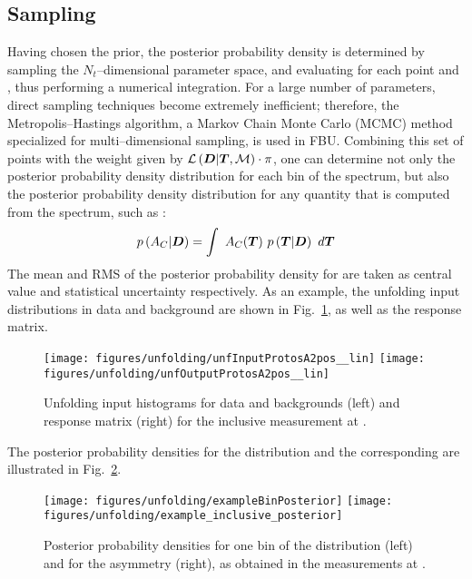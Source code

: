\subsection{Sampling}
\label{sec:sampling}
Having chosen the prior, the posterior probability density
\conditionalProb{\Truth{}}{\Data{}} is determined by sampling the
$N_t$--dimensional parameter space, and evaluating for each point
\conditionalLhood{\Data{}}{\Truth{}} and \prior{}, thus performing a
numerical integration. For a large number of parameters, direct
sampling techniques become extremely inefficient; therefore, the
Metropolis--Hastings algorithm, a Markov
Chain Monte Carlo (MCMC) method specialized for multi--dimensional
sampling, is used in FBU.
Combining this set of points with the weight given by
$\mathcal{L}\left(\boldsymbol{D}{}|\boldsymbol{T}{},\mathcal{M}{}\right)\cdot{}\pi{}$, one
can determine not only the posterior probability density distribution
for each bin of the spectrum, but also the posterior probability
density distribution for any quantity that is computed from the
spectrum, such as \ac{}:
\begin{equation}
p\left(A_C{}|\boldsymbol{D}{}\right) = 
\int~
A_C{}(\boldsymbol{T}{})~
p\left(\boldsymbol{T}{}|\boldsymbol{D}{}\right)~d\boldsymbol{T}{}
\end{equation}
The mean and RMS of the posterior probability
density for \ac{} are taken as central value and statistical uncertainty respectively.
As an example, the unfolding input \dy{} distributions in data and
background are shown in Fig.~\ref{fig:unfinput}, as well as the
response matrix.
\begin{figure}[!htb]\centering
  \texttt{[image: figures/unfolding/unfInputProtosA2pos\_\_lin]}
  \texttt{[image: figures/unfolding/unfOutputProtosA2pos\_\_lin]}
  \caption{
    \label{fig:unfinput}
   Unfolding input histograms for data and backgrounds (left) and
   response matrix (right) for the inclusive \ac{} measurement at \eighttev{}.
   }
\end{figure}
%
The posterior probability densities for the \dy{} distribution and the corresponding
\ac{} are illustrated in Fig.~\ref{fig:posteriorIncl}.
%
\begin{figure}[!htb]\centering
  \texttt{[image: figures/unfolding/exampleBinPosterior]}
  \texttt{[image: figures/unfolding/example\_inclusive\_posterior]}
  \caption{
    \label{fig:posteriorIncl}
   Posterior probability densities for one bin of the \dy{}
   distribution (left) and for the asymmetry \ac{} (right), as
   obtained in the \ac{} measurements at \eighttev{}.
   }
\end{figure}

